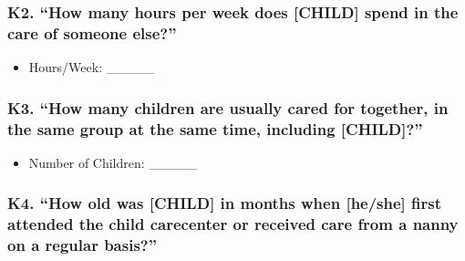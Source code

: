 \documentclass[
  12pt,
]{book}
\providecommand{\tightlist}{%
  \setlength{\itemsep}{0pt}\setlength{\parskip}{0pt}}
\begin{document}
\hypertarget{k2.-how-many-hours-per-week-does-child-spend-in-the-care-of-someone-else}{%
\subsubsection*{K2. ``How many hours per week does {[}CHILD{]} spend in the care of someone else?''}\label{k2.-how-many-hours-per-week-does-child-spend-in-the-care-of-someone-else}}

\begin{itemize}
\tightlist
\item
  Hours/Week: \_\_\_\_\_
\end{itemize}

\hypertarget{k3.-how-many-children-are-usually-cared-for-together-in-the-same-group-at-the-same-time-including-child}{%
\subsubsection*{K3. ``How many children are usually cared for together, in the same group at the same time, including {[}CHILD{]}?''}\label{k3.-how-many-children-are-usually-cared-for-together-in-the-same-group-at-the-same-time-including-child}}

\begin{itemize}
\tightlist
\item
  Number of Children: \_\_\_\_\_
\end{itemize}

\hypertarget{k4.-how-old-was-child-in-months-when-heshe-first-attended-the-child-carecenter-or-received-care-from-a-nanny-on-a-regular-basis}{%
\subsubsection*{K4. ``How old was {[}CHILD{]} in months when {[}he/she{]} first attended the child carecenter or received care from a nanny on a regular basis?''}\label{k4.-how-old-was-child-in-months-when-heshe-first-attended-the-child-carecenter-or-received-care-from-a-nanny-on-a-regular-basis}}
\end{document}
